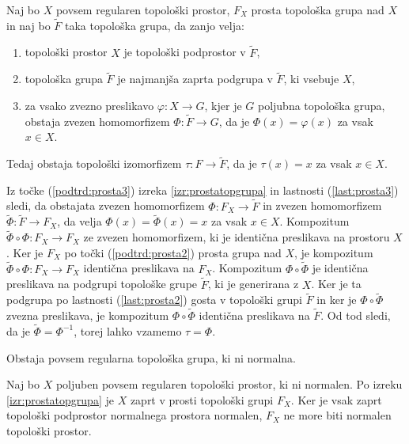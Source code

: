 \documentclass[mat1]{fmfdelo}
\begin{document}
\begin{izrek}\label{izr:prostaizo}
Naj bo $X$ povsem regularen topološki prostor, $F_X$ prosta topološka grupa nad $X$ in naj bo $\widetilde{F}$ taka topološka grupa, da zanjo velja:
\begin{enumerate}
	\item topološki prostor $X$ je topološki podprostor v $\widetilde{F}$,\label{last:prosta1}
	\item topološka grupa $\widetilde{F}$ je najmanjša zaprta podgrupa v $\widetilde{F}$, ki vsebuje $X$,\label{last:prosta2}
	\item za vsako zvezno preslikavo $\varphi\colon X \to G$, kjer je $G$ poljubna topološka grupa, obstaja zvezen homomorfizem $\Phi\colon \widetilde{F} \to G$, da je $\Phi(x) = \varphi(x)$ za vsak $x \in X$.\label{last:prosta3}
\end{enumerate}
Tedaj obstaja topološki izomorfizem $\tau\colon F \to \widetilde{F}$, da je $\tau(x) = x$ za vsak $x \in X$.
\end{izrek}

\begin{dokaz}
Iz točke (\ref{podtrd:prosta3}) izreka \ref{izr:prostatopgrupa} in lastnosti (\ref{last:prosta3}) sledi, da obstajata zvezen homomorfizem $\Phi\colon F_X \to \widetilde{F}$ in zvezen homomorfizem $\widetilde{\Phi}\colon \widetilde{F} \to F_X$, da velja $\Phi(x) = \widetilde{\Phi}(x) = x$ za vsak $x \in X$. Kompozitum $\widetilde{\Phi}\circ\Phi\colon F_X \to F_X$ ze zvezen homomorfizem, ki je identična preslikava na prostoru $X$. Ker je $F_X$ po točki (\ref{podtrd:prosta2}) prosta grupa nad $X$, je kompozitum $\widetilde{\Phi}\circ\Phi\colon F_X \to F_X$ identična preslikava na $F_X$. Kompozitum $\Phi\circ\widetilde{\Phi}$ je identična preslikava na podgrupi topološke grupe $\widetilde{F}$, ki je generirana z $X$. Ker je ta podgrupa po lastnosti (\ref{last:prosta2}) gosta v topološki grupi $\widetilde{F}$ in ker je $\Phi\circ\widetilde{\Phi}$ zvezna preslikava, je kompozitum $\Phi\circ\widetilde{\Phi}$ identična preslikava na $\widetilde{F}$. Od tod sledi, da je $\widetilde{\Phi} = \Phi^{-1}$, torej lahko vzamemo $\tau = \Phi$.
\end{dokaz}

\begin{izrek}
Obstaja povsem regularna topološka grupa, ki ni normalna.
\end{izrek}

\begin{dokaz}
Naj bo $X$ poljuben povsem regularen topološki prostor, ki ni normalen. Po izreku \ref{izr:prostatopgrupa} je $X$ zaprt v prosti topološki grupi $F_X$. Ker je vsak zaprt topološki podprostor normalnega prostora normalen, $F_X$ ne more biti normalen topološki prostor.
\end{dokaz}
\end{document}
